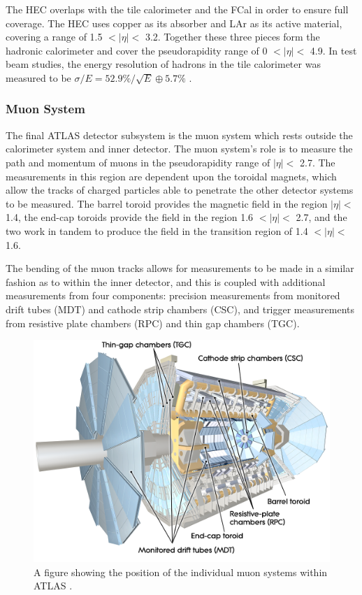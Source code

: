 \documentclass[12pt,a4paper,epsf,portrait,times,epsfig]{article}
\begin{document}
		The HEC overlaps with the tile calorimeter and the FCal in order to ensure full  coverage. The HEC uses copper as its absorber and LAr as its active material, covering a range of 1.5 $< |\eta| <$ 3.2. Together these three pieces form the hadronic calorimeter and cover the
		pseudorapidity range of 0 $< |\eta| <$ 4.9. In test beam studies, the energy resolution of hadrons in the tile calorimeter was measured to be $\sigma/E=52.9\%/\sqrt{E} \oplus 5.7\%$ \cite{Article:FCALCalibration}. 
		
		\subsubsection{Muon System}
		
		The final ATLAS detector subsystem is the muon system which rests outside the calorimeter system and inner detector. The muon system’s role is to measure the path and momentum of muons in the pseudorapidity range of $|\eta| < $ 2.7. The measurements in this region are dependent upon the toroidal magnets, which allow the tracks of charged particles able to penetrate the other detector systems to be measured. The barrel toroid provides the magnetic field in the region $|\eta| <$ 1.4, the end-cap toroids provide the field in the region 1.6 $< |\eta| <$ 2.7, and the two work in tandem to produce the field in the transition region of 1.4 $< |\eta| <$ 1.6. \par
		
		The bending of the muon tracks allows for measurements to be made in a similar fashion	as to within the inner detector, and this is coupled with additional measurements from four components: precision measurements from monitored drift tubes (MDT) and cathode strip chambers (CSC), and trigger measurements from resistive plate chambers (RPC) and thin gap chambers (TGC).\par
		
		
		\begin{figure}
			\centering
			\includegraphics[scale=0.3]{Muon_System}
			\caption{A figure showing the position of the individual muon systems within ATLAS \cite{Article:ATLASDesignPaper}.}
			\label{Fig:MuonSystem}
		\end{figure}
		
\end{document}
